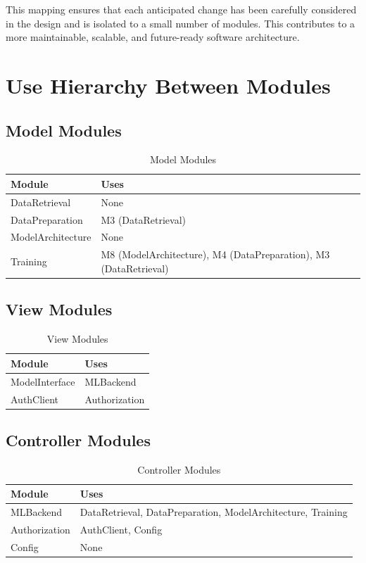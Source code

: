 \documentclass[12pt, titlepage]{article}
\begin{document}
This mapping ensures that each anticipated change has been carefully considered in the design and is isolated to a small number of modules. This contributes to a more maintainable, scalable, and future-ready software architecture.

\newpage

\section{Use Hierarchy Between Modules}

\subsection{Model Modules}
\begin{table}[h!]
\centering
\begin{tabular}{|l|l|}
\hline
\textbf{Module} & \textbf{Uses} \\
\hline
DataRetrieval & None \\
\hline
DataPreparation & M3 (DataRetrieval) \\
\hline
ModelArchitecture & None \\
\hline
Training & M8 (ModelArchitecture), M4 (DataPreparation), M3 (DataRetrieval) \\
\hline
\end{tabular}
\caption{Model Modules}
\label{tab:model_modules}
\end{table}

\subsection{View Modules}
\begin{table}[h!]
\centering
\begin{tabular}{|l|l|}
\hline
\textbf{Module} & \textbf{Uses} \\
\hline
ModelInterface & MLBackend \\
\hline
AuthClient & Authorization \\
\hline
\end{tabular}
\caption{View Modules}
\label{tab:view_modules}
\end{table}

\subsection{Controller Modules}
\begin{table}[h!]
\centering
\begin{tabular}{|l|l|}
\hline
\textbf{Module} & \textbf{Uses} \\
\hline
MLBackend & DataRetrieval, DataPreparation, ModelArchitecture, Training \\
\hline
Authorization & AuthClient, Config \\
\hline
Config & None \\
\hline
\end{tabular}
\caption{Controller Modules}
\label{tab:controller_modules}
\end{table}
\end{document}
